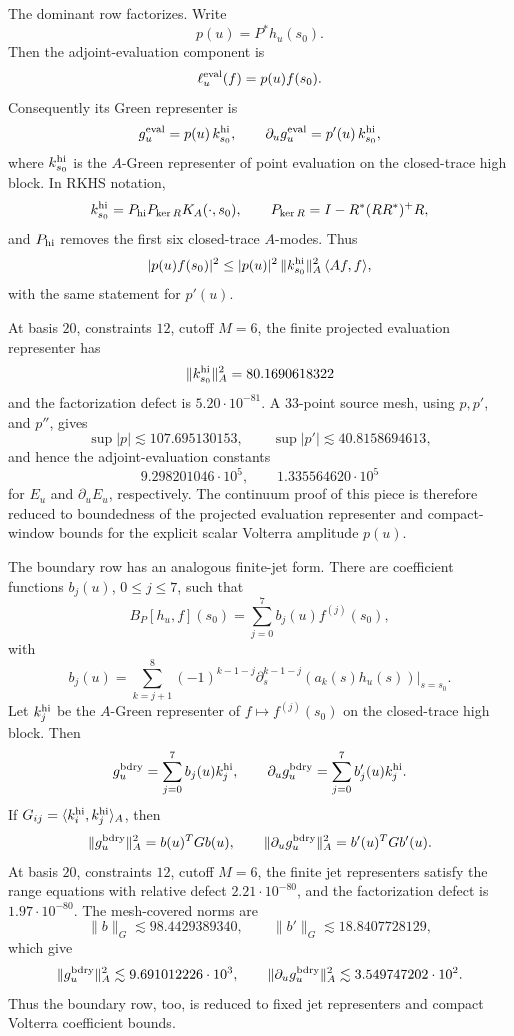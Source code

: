 \documentclass[11pt]{article}
\begin{document}
The dominant row factorizes.  Write
\[
  p(u)=P^\ast h_u(s_0).
\]
Then the adjoint-evaluation component is
\[
  \ell_u^{\rm eval}(f)=p(u)f(s_0).
\]
Consequently its Green representer is
\[
  g_u^{\rm eval}=p(u)\,k_{s_0}^{\rm hi},\qquad
  \partial_u g_u^{\rm eval}=p'(u)\,k_{s_0}^{\rm hi},
\]
where \(k_{s_0}^{\rm hi}\) is the \(A\)-Green representer of point evaluation
on the closed-trace high block.  In RKHS notation,
\[
  k_{s_0}^{\rm hi}=P_{\rm hi}P_{\ker R}K_A(\cdot,s_0),
  \qquad
  P_{\ker R}=I-R^\ast(RR^\ast)^+R,
\]
and \(P_{\rm hi}\) removes the first six closed-trace \(A\)-modes.  Thus
\[
  |p(u)f(s_0)|^2
  \le |p(u)|^2\,\|k_{s_0}^{\rm hi}\|_A^2\,\langle Af,f\rangle,
\]
with the same statement for \(p'(u)\).

At basis \(20\), constraints \(12\), cutoff \(M=6\), the finite projected
evaluation representer has
\[
  \|k_{s_0}^{\rm hi}\|_A^2=80.1690618322
\]
and the factorization defect is \(5.20\cdot10^{-81}\).  A 33-point source
mesh, using \(p,p'\), and \(p''\), gives
\[
\sup |p|\lesssim 107.695130153,\qquad
\sup |p'|\lesssim 40.8158694613,
\]
and hence the adjoint-evaluation constants
\[
  9.298201046\cdot10^5,\qquad 1.335564620\cdot10^5
\]
for \(E_u\) and \(\partial_uE_u\), respectively.  The continuum proof of this
piece is therefore reduced to boundedness of the projected evaluation
representer and compact-window bounds for the explicit scalar Volterra
amplitude \(p(u)\).

The boundary row has an analogous finite-jet form.  There are coefficient
functions \(b_j(u)\), \(0\le j\le7\), such that
\[
  B_P[h_u,f](s_0)=\sum_{j=0}^7 b_j(u)f^{(j)}(s_0),
\]
with
\[
  b_j(u)=\sum_{k=j+1}^8(-1)^{k-1-j}
  \partial_s^{k-1-j}(a_k(s)h_u(s))\big|_{s=s_0}.
\]
Let \(k_j^{\rm hi}\) be the \(A\)-Green representer of
\(f\mapsto f^{(j)}(s_0)\) on the closed-trace high block.  Then
\[
  g_u^{\rm bdry}=\sum_{j=0}^7b_j(u)k_j^{\rm hi},
  \qquad
  \partial_u g_u^{\rm bdry}=\sum_{j=0}^7b'_j(u)k_j^{\rm hi}.
\]
If \(G_{ij}=\langle k_i^{\rm hi},k_j^{\rm hi}\rangle_A\), then
\[
  \|g_u^{\rm bdry}\|_A^2=b(u)^TG b(u),\qquad
  \|\partial_u g_u^{\rm bdry}\|_A^2=b'(u)^TG b'(u).
\]
At basis \(20\), constraints \(12\), cutoff \(M=6\), the finite jet
representers satisfy the range equations with relative defect
\(2.21\cdot10^{-80}\), and the factorization defect is
\(1.97\cdot10^{-80}\).  The mesh-covered norms are
\[
  \|b\|_G\lesssim 98.4429389340,\qquad
  \|b'\|_G\lesssim 18.8407728129,
\]
which give
\[
  \|g_u^{\rm bdry}\|_A^2\lesssim 9.691012226\cdot10^3,\qquad
  \|\partial_u g_u^{\rm bdry}\|_A^2\lesssim 3.549747202\cdot10^2.
\]
Thus the boundary row, too, is reduced to fixed jet representers and compact
Volterra coefficient bounds.
\end{document}
